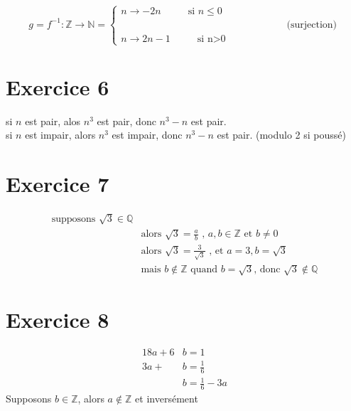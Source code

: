 \documentclass[fontsize=10pt]{article}
\begin{document}
\[
  g=f^{-1}:\mathbb{Z}\rightarrow\mathbb{N} =\begin{cases}
               n \rightarrow -2n \hspace{1cm}\text{ si $n\leq 0$}\\
               \hspace{7cm}\text{(surjection)}\\
               n \rightarrow 2n-1 \hspace{1cm}\text{ si n>0}
            \end{cases}
\]
\section*{Exercice 6}
si $n$ est pair, alos $n^3$ est pair, donc $n^3-n$ est pair.\\
si $n$ est impair, alors $n^3$ est impair, donc $n^3 -n$ est pair. \hspace{0.5cm}(modulo 2 si poussé)
\section*{Exercice 7}
\begin{align*}
\text{supposons } \sqrt{3}\in \mathbb{Q}&\\
&\text{alors }\sqrt{3} = \frac{a}{b} \text{ , } a, b \in \mathbb{Z} \text{ et } b\neq 0\\
&\text{alors }\sqrt{3}=\frac{3}{\sqrt{3}} \text{ , et } a =3, b = \sqrt{3}\\
&\text{mais } b \notin \mathbb{Z} \text{ quand } b =\sqrt{3}\text{, donc } \sqrt{3} \notin \mathbb{Q} 
\end{align*}
\section*{Exercice 8}
\begin{align*}
18a+6&b=1\\
3a+&b=\frac{1}{6}\\
&b = \frac{1}{6} - 3a
\end{align*}
Supposons $b\in \mathbb{Z}$, alors $a\notin \mathbb{Z}$ et inversément
\end{document}
